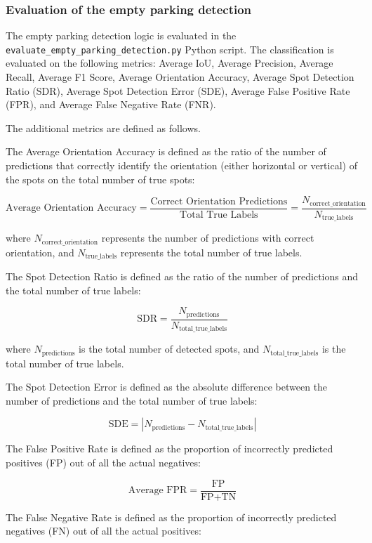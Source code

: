 \newpage{}

\subsubsection{Evaluation of the empty parking detection}
The empty parking detection logic is evaluated in the \texttt{evaluate\_empty\_parking\_detection.py} Python script.
The classification is evaluated on the following metrics: Average IoU, Average Precision, Average Recall, Average F1 Score, Average Orientation Accuracy, Average Spot Detection Ratio (SDR), Average Spot Detection Error (SDE), Average False Positive Rate (FPR), and Average False Negative Rate (FNR).

The additional metrics are defined as follows.

The Average Orientation Accuracy is defined as the ratio of the number of predictions that correctly identify the orientation (either horizontal or vertical) of the spots on the total number of true spots:

\[
\text{Average Orientation Accuracy} = \frac{\text{Correct Orientation Predictions}}{\text{Total True Labels}}
                                    = \frac{N_{\text{correct\_orientation}}}{N_{\text{true\_labels}}}
\]

where \( N_{\text{correct\_orientation}} \) represents the number of predictions with correct orientation, and \( N_{\text{true\_labels}} \) represents the total number of true labels.

The Spot Detection Ratio is defined as the ratio of the number of predictions and the total number of true labels:

\[
\text{SDR} = \frac{N_{\text{predictions}}}{N_{\text{total\_true\_labels}}}
\]

where \( N_{\text{predictions}} \) is the total number of detected spots, and \( N_{\text{total\_true\_labels}} \) is the total number of true labels.

The Spot Detection Error is defined as the absolute difference between the number of predictions and the total number of true labels:

\[
\text{SDE} = |N_{\text{predictions}} - N_{\text{total\_true\_labels}}|
\]

The False Positive Rate is defined as the proportion of incorrectly predicted positives (FP) out of all the actual negatives:

\[
\text{Average FPR} = \frac{\text{FP}}{\text{FP} + \text{TN}}
\]

The False Negative Rate is defined as the proportion of incorrectly predicted negatives (FN) out of all the actual positives:

